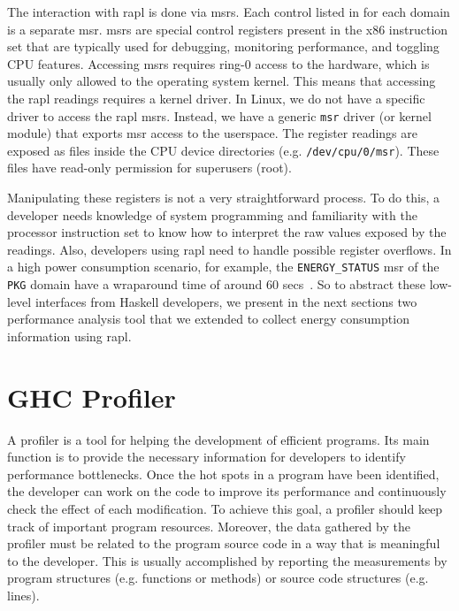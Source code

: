 The interaction with \acs{rapl} is done via \acp{msr}. Each control listed in  for each domain is a separate \ac{msr}. \acp{msr} are special control registers present in the x86 instruction set that are typically used for debugging, monitoring performance, and toggling CPU features. Accessing \acp{msr} requires ring-0 access to the hardware, which is usually only allowed to the operating system kernel. This means that accessing the \ac{rapl} readings requires a kernel driver. In Linux, we do not have a specific driver to access the \ac{rapl} \acp{msr}. Instead, we have a generic \texttt{msr} driver (or kernel module) that exports \ac{msr} access to the userspace. The register readings are exposed as files inside the CPU device directories (e.g. \texttt{/dev/cpu/0/msr}). These files have read-only permission for superusers (root).

Manipulating these registers is not a very straightforward process. To do this, a developer needs knowledge of system programming and familiarity with the processor instruction set to know how to interpret the raw values exposed by the readings. Also, developers using \ac{rapl} need to handle possible register overflows. In a high power consumption scenario, for example, the \texttt{ENERGY\_STATUS} \ac{msr} of the \texttt{PKG} domain have a wraparound time of around 60 secs~\cite[p. 2465]{intel:2016}. So to abstract these low-level interfaces from Haskell developers, we present in the next sections two performance analysis tool that we extended to collect energy consumption information using \ac{rapl}.


\section{GHC Profiler}\label{sec:profiler}
A profiler is a tool for helping the development of efficient programs. Its main function is to provide the necessary information for developers to identify performance bottlenecks. Once the hot spots in a program have been identified, the developer can work on the code to improve its performance and continuously check the effect of each modification. To achieve this goal, a profiler should keep track of important program resources. Moreover, the data gathered by the profiler must be related to the program source code in a way that is meaningful to the developer. This is usually accomplished by reporting the measurements by program structures (e.g. functions or methods) or source code structures (e.g. lines).

